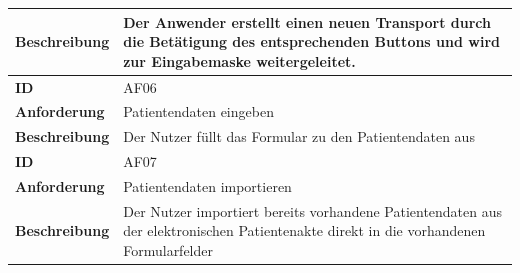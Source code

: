 \documentclass[a4paper, ngerman, 12pt]{scrartcl}
\begin{document}
\begin{tabular}{|l|p{10cm}|}
\hline
\cellcolor{lightgray}\textbf{Beschreibung}&Der Anwender erstellt einen neuen Transport durch die Betätigung des entsprechenden Buttons und wird zur Eingabemaske weitergeleitet.\\
\hline
\hline
\cellcolor{lightgray}\textbf{ID}&AF06\\
\hline
\cellcolor{lightgray}\textbf{Anforderung}&Patientendaten eingeben\\
\hline
\cellcolor{lightgray}\textbf{Beschreibung}&Der Nutzer füllt das Formular zu den Patientendaten aus\\
\hline
\hline
\cellcolor{lightgray}\textbf{ID}&AF07\\
\hline
\cellcolor{lightgray}\textbf{Anforderung}&Patientendaten importieren\\
\hline
\cellcolor{lightgray}\textbf{Beschreibung}&Der Nutzer importiert bereits vorhandene Patientendaten aus der elektronischen Patientenakte direkt in die vorhandenen Formularfelder\\
\hline
\end{tabular}\\
\newpage
\end{document}
